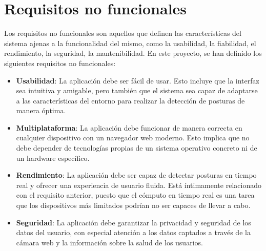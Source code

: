 \section{Requisitos no funcionales}
\label{c06:sec:requisitos-no-funcionales}
Los requisitos no funcionales son aquellos que definen las características del
sistema ajenas a la funcionalidad del mismo, como la usabilidad, la fiabilidad,
el rendimiento, la seguridad, la mantenibilidad. En este proyecto, se han
definido los siguientes requisitos no funcionales:
\begin{itemize}
    \item \textbf{Usabilidad}: La aplicación debe ser fácil de usar. Esto
    incluye que la interfaz sea intuitiva y amigable, pero también que el
    sistema sea capaz de adaptarse a las características del entorno para
    realizar la detección de posturas de manera óptima.

    \item \textbf{Multiplataforma}: La aplicación debe funcionar de manera
    correcta en cualquier dispositivo con un navegador web moderno. Esto implica
    que no debe depender de tecnologías propias de un sistema operativo concreto
    ni de un hardware específico.

    \item \textbf{Rendimiento}: La aplicación debe ser capaz de detectar
    posturas en tiempo real y ofrecer una experiencia de usuario fluida. Está
    íntimamente relacionado con el requisito anterior, puesto que el cómputo en
    tiempo real es una tarea que los dispositivos más limitados podrían no ser
    capaces de llevar a cabo.

    \item \textbf{Seguridad}: La aplicación debe garantizar la privacidad y
    seguridad de los datos del usuario, con especial atención a los datos
    captados a través de la cámara web y la información sobre la salud de los
    usuarios.
\end{itemize}

